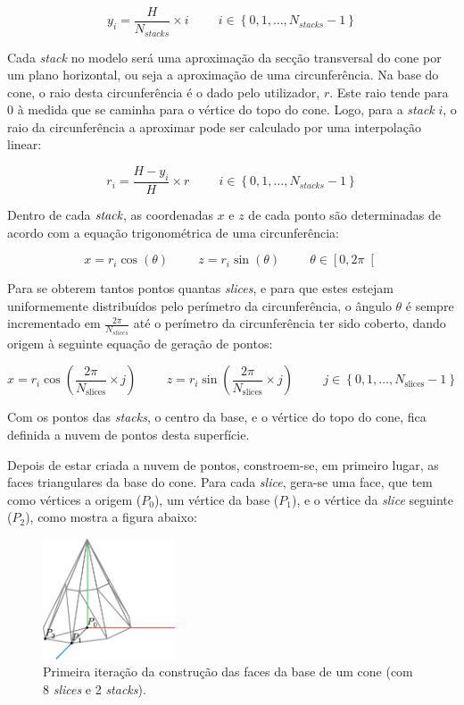 \documentclass[12pt, a4paper]{article}
\begin{document}
$$
y_i = \frac{H}{N_{stacks}} \times i
\hspace{1cm}
i \in \left \lbrace 0, 1, \ldots, N_{stacks} - 1 \right \rbrace
$$

Cada \emph{stack} no modelo será uma aproximação da secção transversal do cone por um plano
horizontal, ou seja a aproximação de uma circunferência. Na base do cone, o raio desta
circunferência é o dado pelo utilizador, $r$. Este raio tende para 0 à medida que se caminha para
o vértice do topo do cone. Logo, para a \emph{stack} $i$, o raio da circunferência a aproximar
pode ser calculado por uma interpolação linear:

$$
r_i = \frac{H - y_i}{H}\times r
\hspace{1cm}
i \in \left \lbrace 0, 1, \ldots, N_{stacks} - 1 \right \rbrace
$$

Dentro de cada $\emph{stack}$, as coordenadas $x$ e $z$ de cada ponto são determinadas de acordo
com a equação trigonométrica de uma circunferência:

$$
x = r_i \cos(\theta)
\hspace{1cm}
z = r_i \sin(\theta)
\hspace{1cm}
\theta \in \left [ 0, 2 \pi \right [
$$

Para se obterem tantos pontos quantas \emph{slices}, e para que estes estejam uniformemente
distribuídos pelo perímetro da circunferência, o ângulo $\theta$ é sempre incrementado em
$\frac{2 \pi}{N_{slices}}$ até o perímetro da circunferência ter sido coberto, dando origem à
seguinte equação de geração de pontos:

$$
x = r_i \cos \left ( \frac{2 \pi}{N_\text{slices}} \times j \right )
\hspace{1cm}
z = r_i \sin \left ( \frac{2 \pi}{N_\text{slices}} \times j \right )
\hspace{1cm}
j \in \left \lbrace 0, 1, \ldots, N_\text{slices} - 1 \right \rbrace
$$

Com os pontos das \emph{stacks}, o centro da base, e o vértice do topo do cone, fica definida a
nuvem de pontos desta superfície.

Depois de estar criada a nuvem de pontos, constroem-se, em primeiro lugar, as faces triangulares da
base do cone. Para cada \emph{slice}, gera-se uma face, que tem  como vértices a origem ($P_0$), um
vértice da base ($P_1$), e o vértice da \emph{slice} seguinte ($P_2$), como mostra a figura abaixo:

\begin{figure}[H]
    \centering
    \includegraphics[width=0.35\textwidth]{res/figures/Cone3.pdf}
    \caption{
        \onehalfspacing
        Primeira iteração da construção das faces da base de um cone (com 8 \emph{slices} e 2
        \emph{stacks}).
    }
\end{figure}
\end{document}
